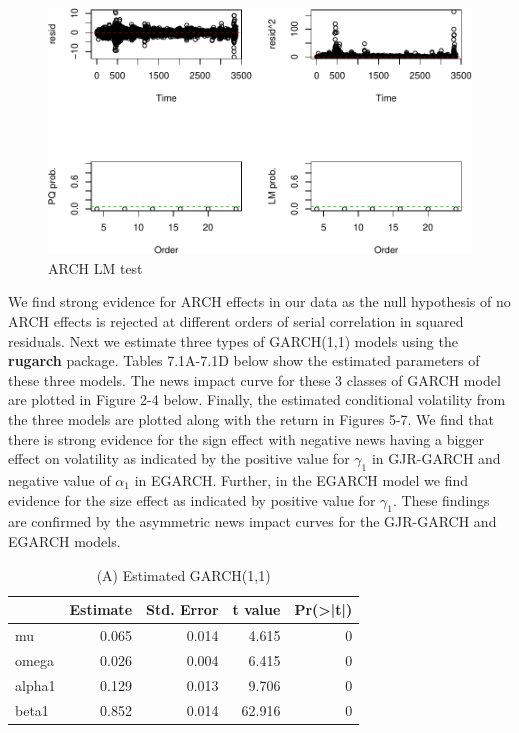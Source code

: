 \documentclass[]{book}
\theoremstyle{definition}
\theoremstyle{definition}
\theoremstyle{definition}
\theoremstyle{remark}
\begin{document}
\begin{figure}
\centering
\includegraphics{bookdown-demo_files/figure-latex/table1-1.pdf}
\caption{\label{fig:table1}ARCH LM test}
\end{figure}

We find strong evidence for ARCH effects in our data as the null
hypothesis of no ARCH effects is rejected at different orders of serial
correlation in squared residuals. Next we estimate three types of
GARCH(1,1) models using the \textbf{rugarch} package. Tables 7.1A-7.1D
below show the estimated parameters of these three models. The news
impact curve for these 3 classes of GARCH model are plotted in Figure
2-4 below. Finally, the estimated conditional volatility from the three
models are plotted along with the return in Figures 5-7. We find that
there is strong evidence for the sign effect with negative news having a
bigger effect on volatility as indicated by the positive value for
\(\gamma_1\) in GJR-GARCH and negative value of \(\alpha_1\) in EGARCH.
Further, in the EGARCH model we find evidence for the size effect as
indicated by positive value for \(\gamma_1\). These findings are
confirmed by the asymmetric news impact curves for the GJR-GARCH and
EGARCH models.

\begin{table}

\caption{\label{tab:unnamed-chunk-11}(A) Estimated GARCH(1,1)}
\centering
\begin{tabular}[t]{l|r|r|r|r}
\hline
  &  Estimate &  Std. Error &  t value & Pr(>|t|)\\
\hline
mu & 0.065 & 0.014 & 4.615 & 0\\
\hline
omega & 0.026 & 0.004 & 6.415 & 0\\
\hline
alpha1 & 0.129 & 0.013 & 9.706 & 0\\
\hline
beta1 & 0.852 & 0.014 & 62.916 & 0\\
\hline
\end{tabular}
\end{table}
\end{document}
